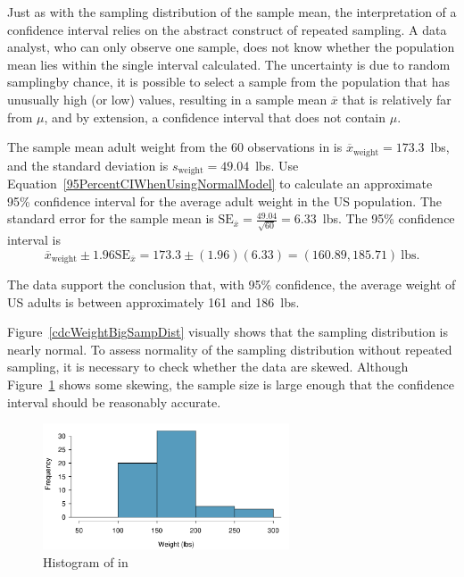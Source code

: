 \textD{\newpage}

Just as with the sampling distribution of the sample mean, the interpretation of a confidence interval relies on the abstract construct of repeated sampling. A data analyst, who can only observe one sample, does not know whether the population mean lies within the single interval calculated. The uncertainty is due to random sampling\textemdash by chance, it is possible to select a sample from the population that has unusually high (or low) values, resulting in a sample mean $\overline{x}$ that is relatively far from $\mu$, and by extension, a confidence interval that does not contain $\mu$. 

\begin{examplewrap}
\begin{nexample}{The sample mean adult weight from the 60 observations in  is $\overline{x}_{\text{weight}} = 173.3$~lbs, and the standard deviation is $s_{\text{weight}} = 49.04$~lbs.  Use Equation~\ref{95PercentCIWhenUsingNormalModel} to calculate an approximate 95\% confidence interval for the average adult weight in the US population.}
  The standard error for the sample mean is  $\text{SE}_{\overline{x}}=\frac{49.04}{\sqrt{60}} = 6.33$~lbs. The 95\% confidence interval is
 \[\overline{x}_{\text{weight}} \pm 1.96 \text{SE}_{\overline{x}} = 173.3 \pm (1.96)(6.33) = (160.89, 185.71)~\text{lbs.} \]
  
  The data support the conclusion that, with 95\% confidence, the average weight of US adults is between approximately 161 and 186~lbs.
  
  Figure~\ref{cdcWeightBigSampDist} visually shows that the sampling distribution is nearly normal. To assess normality of the sampling distribution without repeated sampling, it is necessary to check whether the data are skewed. Although Figure~\ref{cdcWeightHist} shows some skewing, the sample size is large enough that the confidence interval should be reasonably accurate.
\end{nexample}
\end{examplewrap}

\begin{figure}[h]
	\centering
	\includegraphics[width=0.65\textwidth]
	{ch_inference_foundations_oi_biostat/figures/cdcWeightHist/cdcWeightHist.pdf}
	\caption{Histogram of  in  }
	\label{cdcWeightHist}
\end{figure}

